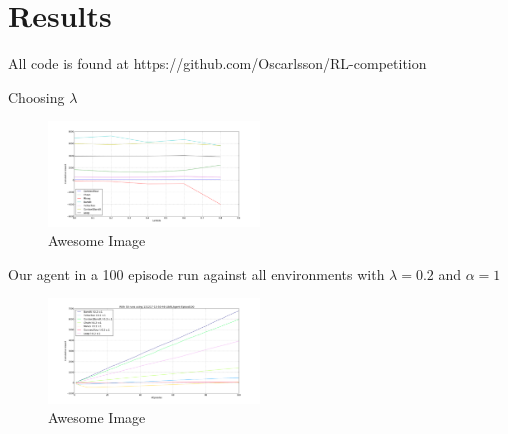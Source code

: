 \documentclass[letterpaper,twocolumn,10pt]{article}
\begin{document}
\section{Results}
All code is found at https://github.com/Oscarlsson/RL-competition

Choosing $\lambda$
\begin{figure}[h]
    \centering
    \includegraphics[width=0.5\textwidth]{../data/lambdasweepplot.png}
    \caption{Awesome Image}
    \label{fig:awesome_image}
\end{figure}


Our agent in a 100 episode run against all environments with $\lambda = 0.2$ and $\alpha = 1$
\begin{figure}[h]
    \centering
    \includegraphics[width=0.5\textwidth]{../data/100episodes_50runs.png}
    \caption{Awesome Image}
    \label{fig:awesome_image}
\end{figure}

{\footnotesize 
}


\theendnotes
\end{document}
